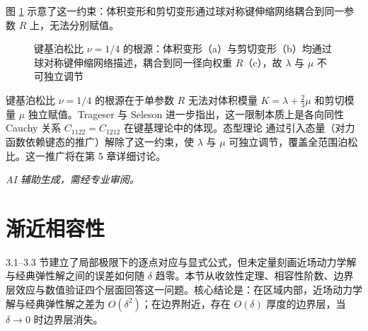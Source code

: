 图 \ref{fig:iso-decomp} 示意了这一约束：体积变形和剪切变形通过球对称键伸缩网络耦合到同一参数 $R$ 上，无法分别赋值。

\begin{figure}[htbp]
\centering
{}
\caption{键基泊松比 $\nu=1/4$ 的根源：体积变形（a）与剪切变形（b）均通过球对称键伸缩网络描述，耦合到同一径向权重 $R$（c），故 $\lambda$ 与 $\mu$ 不可独立调节}
\label{fig:iso-decomp}
\end{figure}

\begin{remark}
键基泊松比 $\nu=1/4$ 的根源在于单参数 $R$ 无法对体积模量 $K=\lambda+\tfrac{2}{3}\mu$ 和剪切模量 $\mu$ 独立赋值。Trageser 与 Seleson \cite{TrageserSeleson2020} 进一步指出，这一限制本质上是各向同性 Cauchy 关系 $C_{1122}=C_{1212}$ 在键基理论中的体现。态型理论 \cite{Silling2007} 通过引入态量（对力函数依赖键态的推广）解除了这一约束，使 $\lambda$ 与 $\mu$ 可独立调节，覆盖全范围泊松比。这一推广将在第 5 章详细讨论。
\end{remark}

\emph{AI 辅助生成，需经专业审阅。}

\section{渐近相容性}
\label{sec:asymptotic-consistency}

3.1--3.3 节建立了局部极限下的逐点对应与显式公式，但未定量刻画近场动力学解与经典弹性解之间的误差如何随 $\delta$ 趋零。本节从收敛性定理、相容性阶数、边界层效应与数值验证四个层面回答这一问题。核心结论是：在区域内部，近场动力学解与经典弹性解之差为 $O(\delta^2)$；在边界附近，存在 $O(\delta)$ 厚度的边界层，当 $\delta\to 0$ 时边界层消失。

